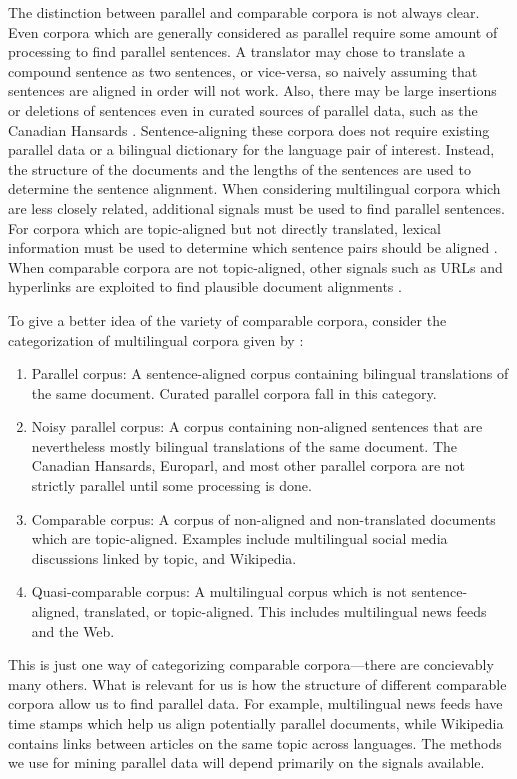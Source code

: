 The distinction between parallel and comparable corpora is not always clear.
Even corpora which are generally considered as parallel require some amount of
processing to find parallel sentences. 
A translator may chose to translate a compound sentence as two sentences, or
vice-versa, so naively assuming that sentences are aligned in order will not
work.
Also, there may be large insertions or deletions of sentences even in curated
sources of parallel data, such as the Canadian Hansards \citep{Gale93,Chen93}.
Sentence-aligning these corpora does not require existing parallel data or a
bilingual dictionary for the language pair of interest. Instead, the structure
of the documents and the lengths of the sentences are used to determine the
sentence alignment. When considering multilingual corpora which are less closely
related, additional signals must be used to
find parallel sentences. For corpora which are topic-aligned but not
directly translated, lexical information must be used to determine which
sentence pairs should be aligned \citep{Munteanu05}. When comparable corpora are
not topic-aligned, other signals such as URLs and hyperlinks are exploited to find plausible document
alignments \citep{Resnik03}.

To give a better idea of the variety of comparable corpora,  consider the
categorization of multilingual corpora given by \citet{Fung04a}:
\begin{enumerate}
\item Parallel corpus: A sentence-aligned corpus containing bilingual
translations of the same document. Curated parallel corpora fall in this
category.
\item Noisy parallel corpus: A corpus containing non-aligned sentences that are
nevertheless mostly bilingual translations of the same document. The Canadian Hansards,
Europarl, and most other parallel corpora are not strictly parallel until some
processing is done.
\item Comparable corpus: A corpus of non-aligned and non-translated documents
which are topic-aligned. Examples include multilingual social media discussions
linked by topic, and Wikipedia.
\item Quasi-comparable corpus: A multilingual corpus which is not
sentence-aligned, translated, or topic-aligned. This includes multilingual news
feeds and the Web.
\end{enumerate}
This is just one way of categorizing comparable corpora---there are concievably
many others. What is relevant for us is how the structure of different
comparable corpora allow us to find parallel data. For example, multilingual news feeds have
time stamps which help us align potentially parallel documents, while Wikipedia
contains links between articles on the same topic across languages. The methods
we use for mining parallel data will depend primarily on the signals available.

